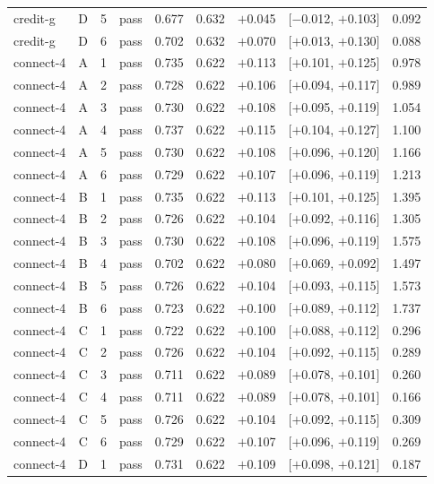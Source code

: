 {\begin{longtable}{lccl rrrcr}
credit-g & D & 5 & pass & 0.677 & 0.632 & $+$0.045 & [$-$0.012, $+$0.103] & 0.092 \\
credit-g & D & 6 & pass & 0.702 & 0.632 & $+$0.070 & [$+$0.013, $+$0.130] & 0.088 \\
\midrule
connect-4 & A & 1 & pass & 0.735 & 0.622 & $+$0.113 & [$+$0.101, $+$0.125] & 0.978 \\
connect-4 & A & 2 & pass & 0.728 & 0.622 & $+$0.106 & [$+$0.094, $+$0.117] & 0.989 \\
connect-4 & A & 3 & pass & 0.730 & 0.622 & $+$0.108 & [$+$0.095, $+$0.119] & 1.054 \\
connect-4 & A & 4 & pass & 0.737 & 0.622 & $+$0.115 & [$+$0.104, $+$0.127] & 1.100 \\
connect-4 & A & 5 & pass & 0.730 & 0.622 & $+$0.108 & [$+$0.096, $+$0.120] & 1.166 \\
connect-4 & A & 6 & pass & 0.729 & 0.622 & $+$0.107 & [$+$0.096, $+$0.119] & 1.213 \\
\addlinespace[2pt]
connect-4 & B & 1 & pass & 0.735 & 0.622 & $+$0.113 & [$+$0.101, $+$0.125] & 1.395 \\
connect-4 & B & 2 & pass & 0.726 & 0.622 & $+$0.104 & [$+$0.092, $+$0.116] & 1.305 \\
connect-4 & B & 3 & pass & 0.730 & 0.622 & $+$0.108 & [$+$0.096, $+$0.119] & 1.575 \\
connect-4 & B & 4 & pass & 0.702 & 0.622 & $+$0.080 & [$+$0.069, $+$0.092] & 1.497 \\
connect-4 & B & 5 & pass & 0.726 & 0.622 & $+$0.104 & [$+$0.093, $+$0.115] & 1.573 \\
connect-4 & B & 6 & pass & 0.723 & 0.622 & $+$0.100 & [$+$0.089, $+$0.112] & 1.737 \\
\addlinespace[2pt]
connect-4 & C & 1 & pass & 0.722 & 0.622 & $+$0.100 & [$+$0.088, $+$0.112] & 0.296 \\
connect-4 & C & 2 & pass & 0.726 & 0.622 & $+$0.104 & [$+$0.092, $+$0.115] & 0.289 \\
connect-4 & C & 3 & pass & 0.711 & 0.622 & $+$0.089 & [$+$0.078, $+$0.101] & 0.260 \\
connect-4 & C & 4 & pass & 0.711 & 0.622 & $+$0.089 & [$+$0.078, $+$0.101] & 0.166 \\
connect-4 & C & 5 & pass & 0.726 & 0.622 & $+$0.104 & [$+$0.092, $+$0.115] & 0.309 \\
connect-4 & C & 6 & pass & 0.729 & 0.622 & $+$0.107 & [$+$0.096, $+$0.119] & 0.269 \\
\addlinespace[2pt]
connect-4 & D & 1 & pass & 0.731 & 0.622 & $+$0.109 & [$+$0.098, $+$0.121] & 0.187 \\

\end{longtable}}
